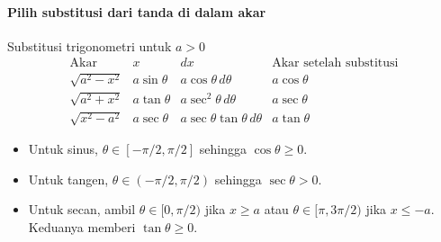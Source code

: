 \documentclass{../../kalkulus-ppt}
\begin{document}
\begin{frame}{\insertsection}
    \framesubtitle{Pilih substitusi dari tanda di dalam akar}
    \begin{block}{Substitusi trigonometri untuk $a>0$}
        \renewcommand{\arraystretch}{1.35}
        \[
            \begin{array}{c|c|c|c}
                \text{Akar} & x & dx & \text{Akar setelah substitusi}\\ \hline
                \sqrt{a^2-x^2} & a\sin\theta & a\cos\theta\,d\theta & a\cos\theta\\
                \sqrt{a^2+x^2} & a\tan\theta & a\sec^2\theta\,d\theta & a\sec\theta\\
                \sqrt{x^2-a^2} & a\sec\theta & a\sec\theta\tan\theta\,d\theta & a\tan\theta
            \end{array}
        \]
    \end{block}
    \begin{itemize}
        \item Untuk sinus, $\theta\in[-\pi/2,\pi/2]$ sehingga $\cos\theta\ge0$.
        \item Untuk tangen, $\theta\in(-\pi/2,\pi/2)$ sehingga $\sec\theta>0$.
        \item Untuk secan, ambil $\theta\in[0,\pi/2)$ jika $x\ge a$ atau
            $\theta\in[\pi,3\pi/2)$ jika $x\le-a$. Keduanya memberi $\tan\theta\ge0$.
    \end{itemize}
\end{frame}
\end{document}
